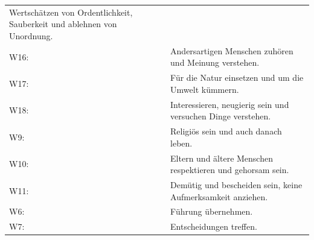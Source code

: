 \documentclass[12pt,ngerman,]{book}
\theoremstyle{definition}
\theoremstyle{definition}
\theoremstyle{remark}
\begin{document}
\begin{longtable}[]{@{}ll@{}}
\begin{minipage}[t]{0.86\columnwidth}
Wertschätzen von Ordentlichkeit, Sauberkeit und ablehnen von
Unordnung.\strut
\end{minipage}\tabularnewline
\begin{minipage}[t]{0.08\columnwidth}\raggedright\strut
W16:\strut
\end{minipage} & \begin{minipage}[t]{0.86\columnwidth}\raggedright\strut
Andersartigen Menschen zuhören und Meinung verstehen.\strut
\end{minipage}\tabularnewline
\begin{minipage}[t]{0.08\columnwidth}\raggedright\strut
W17:\strut
\end{minipage} & \begin{minipage}[t]{0.86\columnwidth}\raggedright\strut
Für die Natur einsetzen und um die Umwelt kümmern.\strut
\end{minipage}\tabularnewline
\begin{minipage}[t]{0.08\columnwidth}\raggedright\strut
W18:\strut
\end{minipage} & \begin{minipage}[t]{0.86\columnwidth}\raggedright\strut
Interessieren, neugierig sein und versuchen Dinge verstehen.\strut
\end{minipage}\tabularnewline
\begin{minipage}[t]{0.08\columnwidth}\raggedright\strut
W9:\strut
\end{minipage} & \begin{minipage}[t]{0.86\columnwidth}\raggedright\strut
Religiös sein und auch danach leben.\strut
\end{minipage}\tabularnewline
\begin{minipage}[t]{0.08\columnwidth}\raggedright\strut
W10:\strut
\end{minipage} & \begin{minipage}[t]{0.86\columnwidth}\raggedright\strut
Eltern und ältere Menschen respektieren und gehorsam sein.\strut
\end{minipage}\tabularnewline
\begin{minipage}[t]{0.08\columnwidth}\raggedright\strut
W11:\strut
\end{minipage} & \begin{minipage}[t]{0.86\columnwidth}\raggedright\strut
Demütig und bescheiden sein, keine Aufmerksamkeit anziehen.\strut
\end{minipage}\tabularnewline
\begin{minipage}[t]{0.08\columnwidth}\raggedright\strut
W6:\strut
\end{minipage} & \begin{minipage}[t]{0.86\columnwidth}\raggedright\strut
Führung übernehmen.\strut
\end{minipage}\tabularnewline
\begin{minipage}[t]{0.08\columnwidth}\raggedright\strut
W7:\strut
\end{minipage} & \begin{minipage}[t]{0.86\columnwidth}\raggedright\strut
Entscheidungen treffen.\strut
\end{minipage}\tabularnewline
\bottomrule
\end{longtable}
\end{document}
